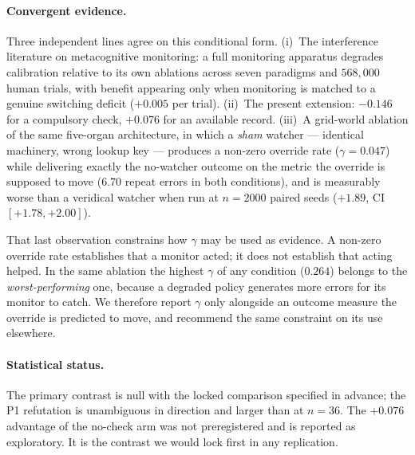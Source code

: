 \paragraph{Convergent evidence.} Three independent lines agree on this
conditional form. (i)~The interference literature on metacognitive
monitoring: a full monitoring apparatus degrades calibration relative to
its own ablations across seven paradigms and $568{,}000$ human trials,
with benefit appearing only when monitoring is matched to a genuine
switching deficit ($+0.005$ per trial). (ii)~The present extension:
$-0.146$ for a compulsory check, $+0.076$ for an available record.
(iii)~A grid-world ablation of the same five-organ architecture, in which a
\emph{sham} watcher --- identical machinery, wrong lookup key --- produces
a non-zero override rate ($\gamma = 0.047$) while delivering exactly the
no-watcher outcome on the metric the override is supposed to move
(6.70 repeat errors in both conditions), and is measurably worse than a
veridical watcher when run at $n=2000$ paired seeds
($+1.89$, CI $[+1.78, +2.00]$).

That last observation constrains how $\gamma$ may be used as evidence.
A non-zero override rate establishes that a monitor acted; it does not
establish that acting helped. In the same ablation the highest $\gamma$ of
any condition ($0.264$) belongs to the \emph{worst-performing} one, because
a degraded policy generates more errors for its monitor to catch. We
therefore report $\gamma$ only alongside an outcome measure the override is
predicted to move, and recommend the same constraint on its use elsewhere.

\paragraph{Statistical status.} The primary contrast is null with the
locked comparison specified in advance; the P1 refutation is unambiguous in
direction and larger than at $n=36$. The $+0.076$ advantage of the
no-check arm was not preregistered and is reported as exploratory. It is
the contrast we would lock first in any replication.
